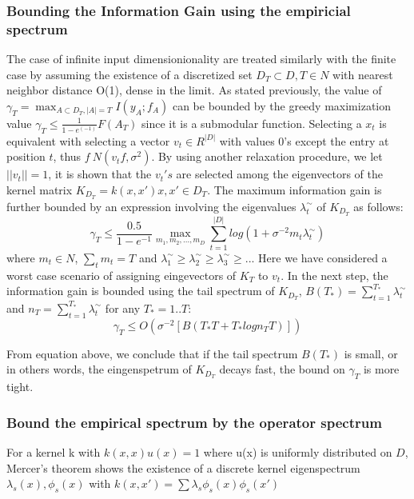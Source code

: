 \documentclass[10pt,journal,a4paper]{IEEEtran}
\begin{document}
\subsubsection{Bounding the Information Gain using the empiricial spectrum}
The case of  infinite input dimensionionality are treated similarly with the finite case by assuming the existence of a discretized set $D_T \subset D, T \in N $ with nearest neighbor distance O(1), dense in the limit. As stated previously, the value of $\gamma_T= \max_{A\subset D_T, |A|=T} I(y_A; f_A)$ can be bounded by the greedy maximization value $ \gamma_T \leq \frac{1}{1-e^(-1)} F(A_T)$ since it is a submodular function. Selecting a $x_t$ is equivalent with selecting a vector $v_t\in R^|D|$ with values 0's except the entry at position $t$, thus $f~ N(v_tf,\sigma^2)$. By using another relaxation procedure, we let $||v_t|| = 1$, it is shown that the $v_t's$ are selected among the eigenvectors of the kernel matrix $K_{D_T} = k(x,x') x,x' \in D_T$. The maximum information gain is further bounded by an expression involving the eigenvalues $\lambda_t^{\sim}$ of $K_{D_T}$ as follows:		
\begin{equation}		
	\gamma_T \leq \frac{0.5}{1-e^{-1}} \max_{m_1,m_2,...,m_D} \sum_{t=1}^{|D|} log(1 + \sigma^{-2}m_t\lambda^{\sim}_t)		
\end{equation}		
where $m_t\in N$, $\sum_t m_t = T$ and $\lambda_1^{\sim} \geq \lambda_2^{\sim} \geq \lambda_3^{\sim} \geq ..$. Here we have considered a worst case scenario of assigning eingevectors of $K_T$ to $v_t$.			
In the next step, the information gain is bounded using the tail spectrum of $K_{D_T}$, $B(T_{*}) = \sum_{t=1}^{T_*}\lambda_t^{\sim}$ and $n_T = \sum_{t=1}^{T_*} \lambda_t^{\sim}$ for any $T_{*}=1..T$:		
\begin{equation}		
\gamma_{T} \leq O(\sigma^{-2}[B(T_{*}T + T_{*}logn_T T)])		
\end{equation}		
		
From equation above, we conclude that if the tail spectrum $B(T_{*})$ is small, or in others words, the eingenspetrum of $K_{D_T}$ decays fast, the bound on $\gamma_T$ is more tight.		
\subsubsection{Bound the empirical spectrum by the operator spectrum}		
For a kernel k with $k(x,x)u(x)=1$ where u(x) is uniformly distributed on $D$, Mercer's theorem shows the existence of a discrete kernel eigenspectrum {$\lambda_s(x), \phi_s(x)$}		
with $k(x,x') = \sum \lambda_s\phi_s(x) \phi_s(x')$		
		
\end{document}

